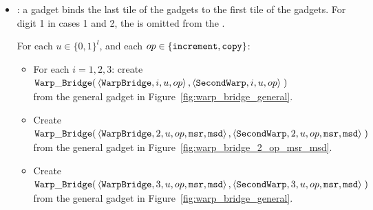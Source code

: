 \begin{itemize}
        \item {\warpbridge}: a {\warpbridge} gadget binds the last tile of the {\firstwarp} gadgets to the
             first tile of the {\secondwarp} gadgets. For digit 1 in cases 1 and 2, the
             {\warpbridge} is omitted from the {\warpunit}.

        For each $u \in \{0, 1\}^l$, and each $op \in \{ {\tt increment, copy } \}$:
        \begin{itemize}

            \item For each $i = 1,2,3$: create
            $\begin{aligned}[t]
                {\tt Warp\_Bridge}(& \left\langle {\tt WarpBridge}, i, u, op \right\rangle,
                              \left\langle {\tt SecondWarp}, i, u, op \right\rangle \;)
            \end{aligned}$ \\ from the general gadget in Figure~\ref{fig:warp_bridge_general}.
            \vspace{.5cm}

            \item Create
            $\begin{aligned}[t]
                {\tt Warp\_Bridge}(& \left\langle {\tt WarpBridge}, 2, u, op, {\tt msr}, {\tt msd} \right\rangle,
                              \left\langle {\tt SecondWarp}, 2, u, op, {\tt msr}, {\tt msd} \right\rangle \;)
            \end{aligned}$ \\ from the general gadget in Figure~\ref{fig:warp_bridge_2_op_msr_msd}.
            \vspace{.5cm}

            \item Create
            $\begin{aligned}[t]
                {\tt Warp\_Bridge}(& \left\langle {\tt WarpBridge}, 3, u, op, {\tt msr}, {\tt msd} \right\rangle,
                              \left\langle {\tt SecondWarp}, 3, u, op, {\tt msr}, {\tt msd} \right\rangle \;)
            \end{aligned}$ \\ from the general gadget in Figure~\ref{fig:warp_bridge_general}.
            \vspace{.5cm}
        \end{itemize}



\end{itemize}
